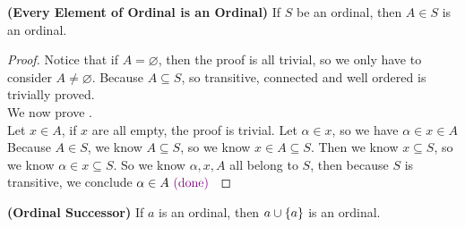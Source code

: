 \documentclass{report}
\begin{document}
\begin{theorem}
\label{0.2.7}
\textbf{(Every Element of Ordinal is an Ordinal)} If $S$ be an ordinal, then  $A \in S$ is an ordinal.
\end{theorem}
\begin{proof}
Notice that if $A=\varnothing$, then the proof is all trivial, so we only have to consider $A\neq \varnothing$. Because $A \subseteq S$, so transitive,  connected and well ordered is trivially proved.\\




We now prove .\\

Let $x\in A$, if $x$ are all empty, the proof is trivial. Let $\alpha \in x$, so we have $\alpha \in x \in A$\\

Because $A\in S$, we know $A \subseteq S$, so we know $x \in A \subseteq S$. Then we know $x \subseteq S$, so we know $\alpha \in x \subseteq S$. So we know $\alpha ,x,A$ all belong to $S$, then because $S$ is transitive, we conclude  $\alpha \in A\textcolor{violet}{\text{ (done) }} $
\end{proof}
\begin{theorem}
\label{0.2.8}
\textbf{(Ordinal Successor)}
If $a$ is an ordinal, then  $a\cup \{ a \}$ is an ordinal.
\end{theorem}
\end{document}
